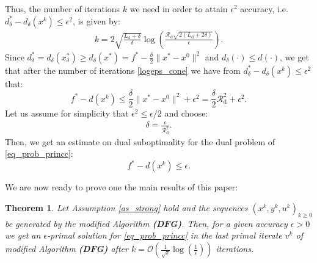 \documentclass{gOMS2e}
\theoremstyle{plain}
\newtheorem{theorem}{Theorem}[section]
\theoremstyle{definition}
\theoremstyle{remark}
\begin{document}
\noindent Thus, the number of iterations $k$ we need in order to
attain $\epsilon^2$ accuracy, i.e. $d_\delta^* - d_\delta(x^k) \leq
\epsilon^2$,  is given by:
\begin{align}
\label{logeps_cone} k =2 \sqrt{\frac{L_\text{d}+\delta}{\delta}}
\log \left( \frac{  \mathcal{R}_{\text{d}} \sqrt{2(L_\text{d} +
2\delta)}}{\epsilon} \right).
\end{align}
Since $d_\delta^* = d_\delta (x_\delta^*) \geq d_\delta(x^*) = f^* -
\frac{\delta}{2} \|x^*  - x^0\|^2$ and $d_\delta (\cdot) \leq
d(\cdot)$, we get that after the number of iterations
\eqref{logeps_cone} we have from $d_\delta^* - d_\delta(x^k) \leq
\epsilon^2$ that:
\[ f^* - d(x^k) \leq \frac{\delta}{2} \|x^* - x^0\|^2 + \epsilon^2 = \frac{\delta}{2} \mathcal{R}_{\text{d}}^2  + \epsilon^2.
\]
Let us assume  for simplicity that $\epsilon^2 \leq \epsilon/2$ and
choose:
\begin{align}
\label{delta_cone} \delta =
\frac{\epsilon}{\mathcal{R}_{\text{d}}^2}.
\end{align}
Then, we get an estimate on dual suboptimality for the  dual problem
of  \eqref{eq_prob_princc}:
\[ f^* - d(x^k) \leq \epsilon.  \]

\noindent We are now ready to prove one the main results of this
paper:
\begin{theorem}
\label{th_dfglast_cone}  Let Assumption \ref{as_strong} hold and the
sequences $\left(x^k, y^k, u^k\right)_{k\geq 0}$ be generated by the
modified  Algorithm {\bf (DFG)}. Then, for a given accuracy
$\epsilon>0$ we get an $\epsilon$-primal solution for
\eqref{eq_prob_princc} in the last primal  iterate $v^{k}$ of
modified  Algorithm \textbf{(DFG)} after $k =
\mathcal{O}(\frac{1}{\sqrt{\epsilon}} \log(\frac{1}{\epsilon}))$
iterations.
\end{theorem}
\end{document}
